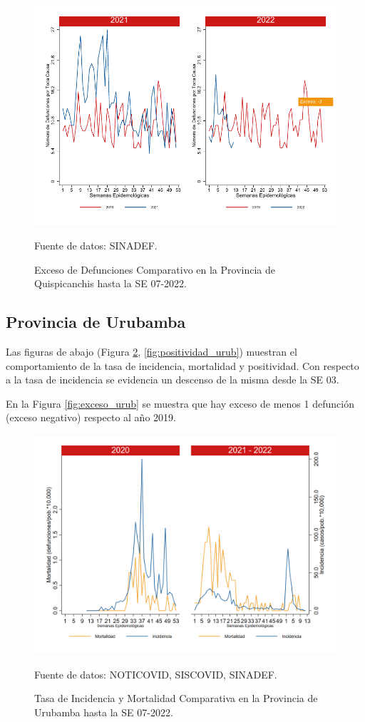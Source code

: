 \documentclass[12pt,a4paper,openany]{book}
\begin{document}
		\begin{figure}[h]
			\caption{Exceso de Defunciones Comparativo en la Provincia de Quispicanchis hasta la SE 07-2022.}\label{fig:exceso_quisp}
			\begin{center}
				\includegraphics[width=0.7\linewidth]{../figuras/exceso_12.pdf}
			\end{center}
			{\footnotesize {Fuente de datos: SINADEF.}}
		\end{figure}
		
		\clearpage
		
		\subsection*{Provincia de Urubamba}
		\noindent Las figuras de abajo (Figura \ref{fig:inc_urub}, \ref{fig:positividad_urub}) muestran el comportamiento de la tasa de incidencia, mortalidad y positividad. Con respecto a la tasa de incidencia se evidencia un descenso de la misma desde la SE 03. 
	
		En la Figura \ref{fig:exceso_urub} se muestra que hay exceso de menos 1 defunción (exceso negativo) respecto al año 2019.
		
		\begin{figure}[h]
			\caption{Tasa de Incidencia y Mortalidad Comparativa en la Provincia de Urubamba hasta la SE 07-2022.}\label{fig:inc_urub}
			\begin{center}
				\includegraphics[width=0.85\linewidth]{../figuras/incidencia_mortalidad_20_21_13.png}
			\end{center}
			{\footnotesize {Fuente de datos: NOTICOVID, SISCOVID, SINADEF.}}
		\end{figure}
		
\end{document}
